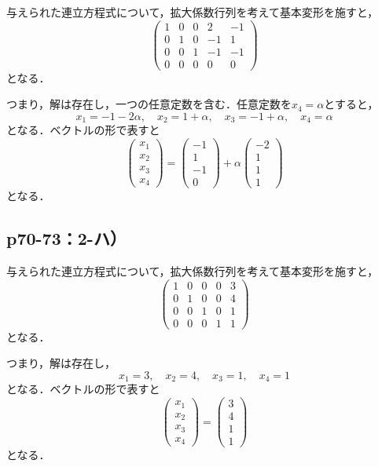 \documentclass[uplatex,dvipdfmx,a4paper,10pt,fleqn]{jsarticle}
\begin{document}
\begin{tleftbar}
    与えられた連立方程式について，拡大係数行列を考えて基本変形を施すと，
    \[
        \begin{pmatrix} 1 & 0 & 0  & 2 & -1 \\ 0 & 1& 0  & -1 & 1 \\ 0 & 0 & 1 & -1 & -1 \\ 0 & 0 & 0 & 0 & 0 \end{pmatrix}
    \]
    となる．

    つまり，解は存在し，一つの任意定数を含む．任意定数を$x_4 = \alpha$とすると，
    \[
        x_1 = -1 -2\alpha   , \quad x_2 =1+\alpha  , \quad x_3 =-1+ \alpha  , \quad x_4 = \alpha 
    \]
    となる．ベクトルの形で表すと
    \[
        \begin{pmatrix} x_1 \\ x_2 \\ x_3 \\ x_4  \end{pmatrix}= \begin{pmatrix} -1 \\ 1 \\ -1 \\ 0 \end{pmatrix} +\alpha \begin{pmatrix} -2 \\ 1\\ 1 \\ 1\end{pmatrix}
    \]
    となる．
\end{tleftbar}

\newpage 

\subsection*{p70-73：2-ハ）}

\begin{tleftbar}
    与えられた連立方程式について，拡大係数行列を考えて基本変形を施すと，
    \[
        \begin{pmatrix} 1 & 0 & 0  & 0 & 3 \\ 0 & 1& 0  & 0 & 4 \\ 0 & 0 & 1 & 0 & 1 \\ 0 & 0 & 0 & 1 & 1 \end{pmatrix}
    \]
    となる．

    つまり，解は存在し，
    \[
        x_1 = 3 , \quad x_2 =4 , \quad x_3 = 1 , \quad x_4 = 1
    \]
    となる．ベクトルの形で表すと
    \[
        \begin{pmatrix} x_1 \\ x_2 \\ x_3 \\ x_4 \end{pmatrix}= \begin{pmatrix} 3 \\ 4 \\ 1 \\ 1 \end{pmatrix} 
    \]
    となる．
\end{tleftbar}
\end{document}
